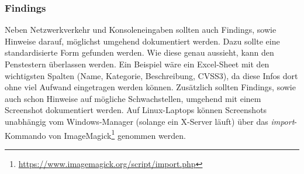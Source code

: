 		\subsubsection{Findings}
		Neben Netzwerkverkehr und Konsoleneingaben sollten auch Findings, sowie Hinweise darauf, möglichst umgehend dokumentiert werden. Dazu sollte eine standardisierte Form gefunden werden. Wie diese genau aussieht, kann den Penstestern überlassen werden. Ein Beispiel wäre ein Excel-Sheet mit den wichtigsten Spalten (Name, Kategorie, Beschreibung, CVSS3), da diese Infos dort ohne viel Aufwand eingetragen werden können. Zusätzlich sollten Findings, sowie auch schon Hinweise auf mögliche Schwachstellen, umgehend mit einem Screenshot dokumentiert werden. Auf Linux-Laptops können Screenshots unabhängig vom Windows-Manager (solange ein X-Server läuft) über das \textit{import}-Kommando von ImageMagick\footnote{\url{https://www.imagemagick.org/script/import.php}} genommen werden.